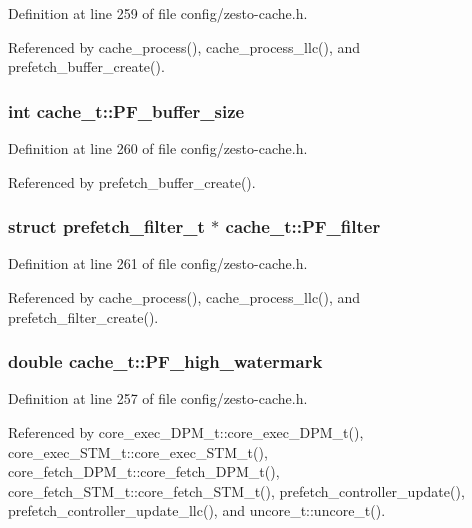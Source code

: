 Definition at line 259 of file config/zesto-cache.h.

Referenced by cache\_\-process(), cache\_\-process\_\-llc(), and prefetch\_\-buffer\_\-create().
\subsubsection[{PF\_\-buffer\_\-size}]{\setlength{\rightskip}{0pt plus 5cm}int {\bf cache\_\-t::PF\_\-buffer\_\-size}}\label{structcache__t_68524485e50f7d2e1120a54c20afc0a7}




Definition at line 260 of file config/zesto-cache.h.

Referenced by prefetch\_\-buffer\_\-create().
\subsubsection[{PF\_\-filter}]{\setlength{\rightskip}{0pt plus 5cm}struct {\bf prefetch\_\-filter\_\-t} $\ast$ {\bf cache\_\-t::PF\_\-filter}\hspace{0.3cm}{\tt  [read]}}\label{structcache__t_dbfc915600b3e46709bb239ab354e59e}




Definition at line 261 of file config/zesto-cache.h.

Referenced by cache\_\-process(), cache\_\-process\_\-llc(), and prefetch\_\-filter\_\-create().
\subsubsection[{PF\_\-high\_\-watermark}]{\setlength{\rightskip}{0pt plus 5cm}double {\bf cache\_\-t::PF\_\-high\_\-watermark}}\label{structcache__t_aa1cd32fa5467078fd28379cf03dd676}




Definition at line 257 of file config/zesto-cache.h.

Referenced by core\_\-exec\_\-DPM\_\-t::core\_\-exec\_\-DPM\_\-t(), core\_\-exec\_\-STM\_\-t::core\_\-exec\_\-STM\_\-t(), core\_\-fetch\_\-DPM\_\-t::core\_\-fetch\_\-DPM\_\-t(), core\_\-fetch\_\-STM\_\-t::core\_\-fetch\_\-STM\_\-t(), prefetch\_\-controller\_\-update(), prefetch\_\-controller\_\-update\_\-llc(), and uncore\_\-t::uncore\_\-t().
